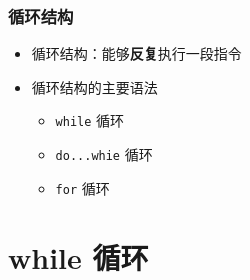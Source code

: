 \begin{frame}[fragile]
    \frametitle{循环结构}

    \begin{itemize}
        \item<1-> 循环结构：能够\textbf{反复}执行一段指令

        \item<2-> 循环结构的主要语法

            \begin{itemize}
                \item \lstinline|while| 循环
                \item \lstinline|do...whie| 循环
                \item \lstinline|for| 循环
            \end{itemize}

    \end{itemize}
\end{frame}


\section{while 循环}

